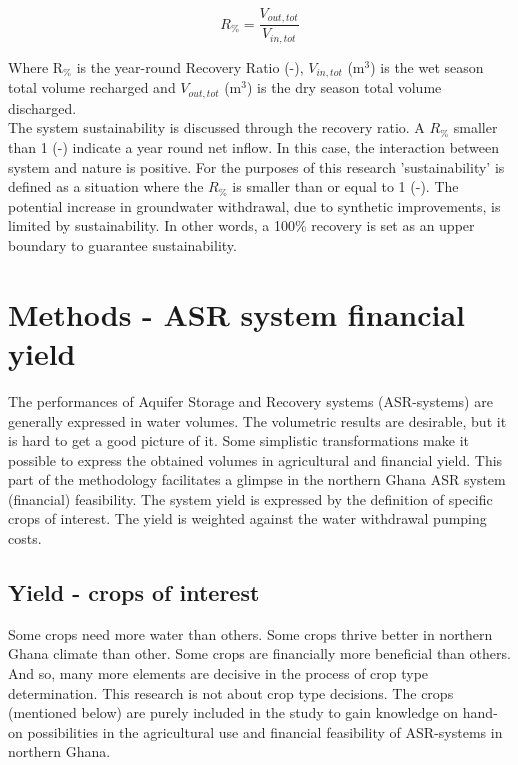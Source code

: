 \begin{equation}
 R_{\%} = \frac{V_{out,tot}}{V_{in,tot}}
\label{eq:RR}
\end{equation}

Where  R$_{\%}$ is the year-round Recovery Ratio (-), $V_{in,tot}$ (m$^3$) is the wet season total volume recharged and $V_{out,tot}$ (m$^3$) is the dry season total volume discharged. \\

The system sustainability is discussed through the recovery ratio. A $R_{\%}$ smaller than 1 (-) indicate a year round net inflow. In this case, the interaction between system and nature is positive. For the purposes of this research 'sustainability' is defined as a situation where the $R_{\%}$ is smaller than or equal to 1 (-). The potential increase in groundwater withdrawal, due to synthetic improvements, is limited by sustainability. In other words, a 100\% recovery is set as an upper boundary to guarantee sustainability. 

\section{Methods - ASR system financial yield}
\label{section:Theory_yields}

The performances of Aquifer Storage and Recovery systems (ASR-systems) are generally expressed in water volumes. The volumetric results are desirable, but it is hard to get a good picture of it. Some simplistic transformations make it possible to express the obtained volumes in agricultural and financial yield.  This part of the methodology facilitates a glimpse in the northern Ghana ASR system (financial) feasibility. The system yield is expressed by the definition of specific crops of interest. The yield is weighted against the water withdrawal pumping costs.

\subsection{Yield - crops of interest}
Some crops need more water than others. Some crops thrive better in northern Ghana climate than other. Some crops are financially more beneficial than others. And so, many more elements are decisive in the process of crop type determination. This research is not about crop type decisions. The crops (mentioned below) are purely included in the study to gain knowledge on hand-on possibilities in the agricultural use and financial feasibility of ASR-systems in northern Ghana. \\

